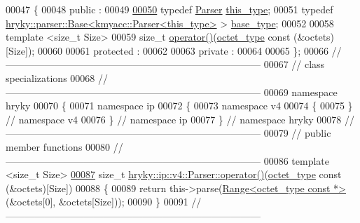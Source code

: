 \begin{DoxyCode}
00047 \{
00048 \textcolor{keyword}{public} :
00049 
\hypertarget{ip__v4__parser_8h_source_l00050}{}\hyperlink{classhryky_1_1ip_1_1v4_1_1_parser_ab85551348aa8cf5c7da65859d0d0448f}{00050}     \textcolor{keyword}{typedef} \hyperlink{classhryky_1_1ip_1_1v4_1_1_parser}{Parser} \hyperlink{classhryky_1_1ip_1_1v4_1_1_parser_ab85551348aa8cf5c7da65859d0d0448f}{this_type};
00051     \textcolor{keyword}{typedef} \hyperlink{classhryky_1_1parser_1_1_base}{hryky::parser::Base<kmyacc::Parser<this_type>} > \hyperlink{classhryky_1_1parser_1_1_base}{base_type};
00052 
00058     \textcolor{keyword}{template} <\textcolor{keywordtype}{size\_t} Size>
00059     \textcolor{keywordtype}{size\_t} \hyperlink{classhryky_1_1ip_1_1v4_1_1_parser_a95e8f941786866793f1947c4423ccab4}{operator()}(\hyperlink{namespacehryky_a488cba8b666be33ccca70e819684e3c8}{octet_type} \textcolor{keyword}{const} (&octets)[Size]);
00060     
00061 \textcolor{keyword}{protected} :
00062 
00063 \textcolor{keyword}{private} :
00064 
00065 \};
00066 \textcolor{comment}{//
      ------------------------------------------------------------------------------}
00067 \textcolor{comment}{// class specializations}
00068 \textcolor{comment}{//
      ------------------------------------------------------------------------------}
00069 \textcolor{keyword}{namespace }hryky
00070 \{
00071 \textcolor{keyword}{namespace }ip
00072 \{
00073 \textcolor{keyword}{namespace }v4
00074 \{
00075 \} \textcolor{comment}{// namespace v4}
00076 \} \textcolor{comment}{// namespace ip}
00077 \} \textcolor{comment}{// namespace hryky}
00078 \textcolor{comment}{//
      ------------------------------------------------------------------------------}
00079 \textcolor{comment}{// public member functions}
00080 \textcolor{comment}{//
      ------------------------------------------------------------------------------}
00086 \textcolor{comment}{}\textcolor{keyword}{template} <\textcolor{keywordtype}{size\_t} Size>
\hypertarget{ip__v4__parser_8h_source_l00087}{}\hyperlink{classhryky_1_1ip_1_1v4_1_1_parser_a95e8f941786866793f1947c4423ccab4}{00087} \textcolor{keywordtype}{size\_t} \hyperlink{classhryky_1_1ip_1_1v4_1_1_parser_a95e8f941786866793f1947c4423ccab4}{hryky::ip::v4::Parser::operator()}(\hyperlink{namespacehryky_a488cba8b666be33ccca70e819684e3c8}{octet_type} \textcolor{keyword}{const} (&octets)[Size])
00088 \{
00089     \textcolor{keywordflow}{return} this->parse(\hyperlink{classhryky_1_1_range}{Range<octet_type const *>}(&octets[0], &octets[Size]));
00090 \}
00091 \textcolor{comment}{//
      ------------------------------------------------------------------------------}

\end{DoxyCode}
